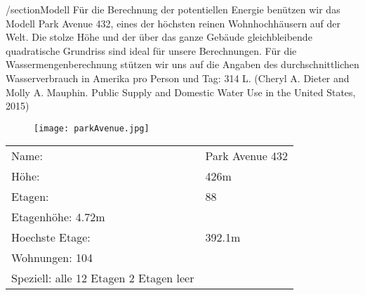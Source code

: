 /section{Modell}
Für die Berechnung der potentiellen Energie benützen wir das Modell Park Avenue 432, eines der höchsten reinen Wohnhochhäusern auf der Welt. Die stolze Höhe und der über das ganze Gebäude gleichbleibende quadratische Grundriss sind ideal für unsere Berechnungen. Für die Wassermengenberechnung stützen wir uns auf die Angaben des durchschnittlichen Wasserverbrauch in Amerika pro Person und Tag: 314 L. (Cheryl A. Dieter and Molly A. Mauphin. Public Supply and Domestic Water Use in the United States, 2015)
\begin{figure}[H]
\centering
\texttt{[image: parkAvenue.jpg]}

\end{figure}
\begin{table}[H]
\begin{tabular}{ll}
Name:				& Park Avenue 432\\
Höhe: 				& 426m\\          
Etagen:				& 88\\
Etagenhöhe:			4.72m\\
Hoechste Etage:		&392.1m\\
Wohnungen:			104\\
Speziell:			alle 12 Etagen 2 Etagen leer\\           
\end{tabular}
\end{table}
